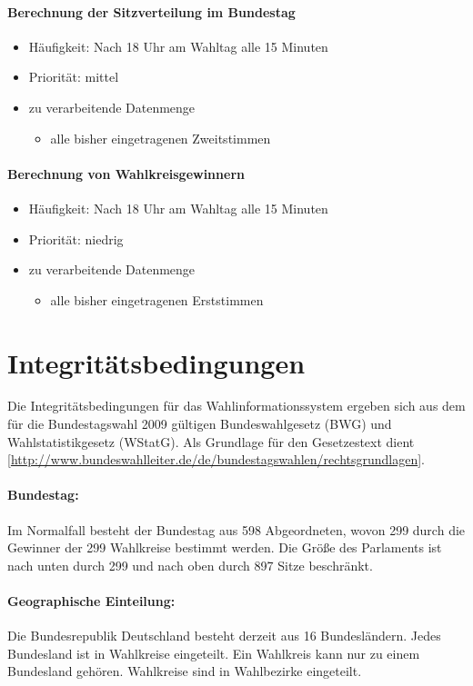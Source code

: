 \documentclass[a4paper]{article}
\begin{document}
\paragraph{Berechnung der Sitzverteilung im Bundestag}
\begin{itemize}
\item Häufigkeit: Nach 18 Uhr am Wahltag alle 15 Minuten
\item Priorität: mittel
\item zu verarbeitende Datenmenge
\begin{itemize}
	\item alle bisher eingetragenen Zweitstimmen
\end{itemize}
\end{itemize}

\paragraph{Berechnung von Wahlkreisgewinnern}
\begin{itemize}
\item Häufigkeit: Nach 18 Uhr am Wahltag alle 15 Minuten
\item Priorität: niedrig
\item zu verarbeitende Datenmenge
\begin{itemize}
	\item alle bisher eingetragenen Erststimmen
\end{itemize}
\end{itemize}

\section{Integritätsbedingungen}

Die Integritätsbedingungen für das Wahlinformationssystem ergeben sich aus dem für die Bundestagswahl 2009 gültigen Bundeswahlgesetz (BWG) und Wahlstatistikgesetz (WStatG). Als Grundlage für den Gesetzestext dient [\url{http://www.bundeswahlleiter.de/de/bundestagswahlen/rechtsgrundlagen}].

\paragraph{Bundestag:} Im Normalfall besteht der Bundestag aus 598 Abgeordneten, wovon 299 durch die Gewinner der 299 Wahlkreise bestimmt werden. Die Größe des Parlaments ist nach unten durch 299 und nach oben durch 897 Sitze beschränkt. 

\paragraph{Geographische Einteilung:} Die Bundesrepublik Deutschland besteht derzeit aus 16 Bundesländern. Jedes Bundesland ist in Wahlkreise eingeteilt. Ein Wahlkreis kann nur zu einem Bundesland gehören. Wahlkreise sind in Wahlbezirke eingeteilt.
\end{document}

